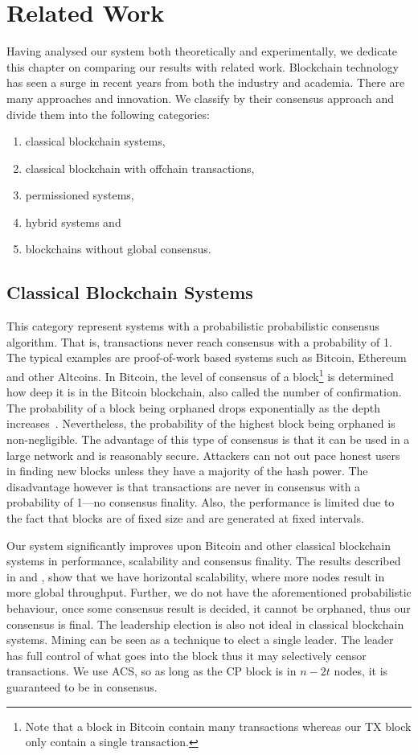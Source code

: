 \chapter{Related Work}
\label{ch:related}

Having analysed our system both theoretically and experimentally,
we dedicate this chapter on comparing our results with related work.
Blockchain technology has seen a surge in recent years from both the industry and academia.
There are many approaches and innovation.
We classify by their consensus approach and divide them into the following categories: 
\begin{enumerate}
    \item classical blockchain systems,
    \item classical blockchain with offchain transactions,
    \item permissioned systems,
    \item hybrid systems and
    \item blockchains without global consensus.
\end{enumerate}

\section{Classical Blockchain Systems}
This category represent systems with a probabilistic probabilistic consensus algorithm.
That is, transactions never reach consensus with a probability of 1.
The typical examples are proof-of-work based systems such as Bitcoin, Ethereum and other Altcoins.
In Bitcoin, the level of consensus of a block\footnote{Note that a block in Bitcoin contain many transactions whereas our TX block only contain a single transaction.}
is determined how deep it is in the Bitcoin blockchain, also called the number of confirmation.
The probability of a block being orphaned drops exponentially as the depth increases~\cite{bitcoin}.
Nevertheless, the probability of the highest block being orphaned is non-negligible.
The advantage of this type of consensus is that it can be used in a large network and is reasonably secure.
Attackers can not out pace honest users in finding new blocks unless they have a majority of the hash power.
The disadvantage however is that transactions are never in consensus with a probability of 1---no consensus finality.
Also, the performance is limited due to the fact that blocks are of fixed size and are generated at fixed intervals.

Our system significantly improves upon Bitcoin and other classical blockchain systems in performance, scalability and consensus finality.
The results described in  and , show that we have horizontal scalability,
where more nodes result in more global throughput.
Further, we do not have the aforementioned probabilistic behaviour,
once some consensus result is decided, it cannot be orphaned, thus our consensus is final.
The leadership election is also not ideal in classical blockchain systems.
Mining can be seen as a technique to elect a single leader.
The leader has full control of what goes into the block thus it may selectively censor transactions.
We use ACS, so as long as the CP block is in $n - 2t$ nodes, it is guaranteed to be in consensus.

